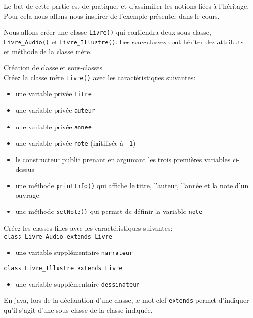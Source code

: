 Le but de cette partie est de pratiquer et d'assimilier les notions liées à l'héritage. Pour cela nous allons nous inspirer de l'exemple présenter dans le cours. 

Nous allons créer une classe \lstinline{Livre()} qui contiendra deux sous-classe, \lstinline{Livre_Audio()} et \lstinline{Livre_Illustre()}. Les sous-classes cont hériter des attributs et méthode de la classe mère. 

\begin{Exercice}[10 minutes] Création de classe et sous-classes\\

Créez la classe mère \lstinline{Livre()} avec les caractéristiques suivantes:
\begin{itemize}
	\item une variable privée \lstinline{titre}
	\item une variable privée \lstinline{auteur}
	\item une variable privée \lstinline{annee}
	\item une variable privée \lstinline{note} (initilisée à \lstinline{-1})
	\item le constructeur public prenant en argumant les trois premières variables ci-dessus
	\item une méthode \lstinline{printInfo()} qui affiche le titre, l'auteur, l'année et la note d'un ouvrage
	\item une méthode \lstinline{setNote()} qui permet de définir la variable \lstinline{note}
\end{itemize}

Créez les classes filles avec les caractéristiques suivantes:\\
\lstinline{class Livre_Audio extends Livre}
\begin{itemize}
	\item une variable supplémentaire \lstinline{narrateur}

\end{itemize}
\lstinline{class Livre_Illustre extends Livre}
\begin{itemize}
	\item une variable supplémentaire \lstinline{dessinateur}

\end{itemize}



\begin{conseil}
En java, lors de la déclaration d'une classe, le mot clef \lstinline{extends} permet d'indiquer qu'il s'agit d'une sous-classe de la classe indiquée. 


\end{conseil}
\end{Exercice}
